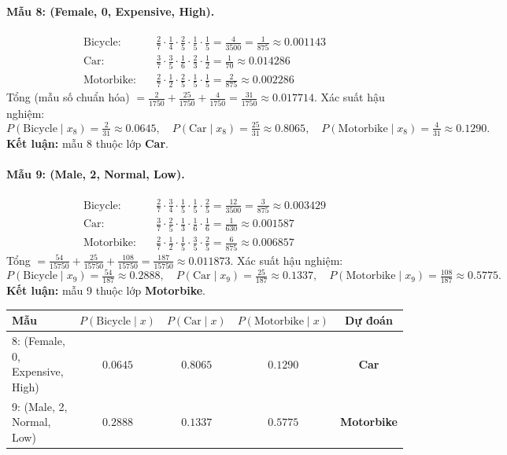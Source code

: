 \documentclass[a4paper,11pt]{article}
\begin{document}
\paragraph{Mẫu 8: (Female, 0, Expensive, High).}
\begin{align*}
\text{Bicycle:}\quad & \tfrac27\cdot\tfrac14\cdot\tfrac25\cdot\tfrac15\cdot\tfrac15=\tfrac{4}{3500}=\tfrac{1}{875}\approx0.001143\\
\text{Car:}\quad & \tfrac37\cdot\tfrac35\cdot\tfrac16\cdot\tfrac23\cdot\tfrac12=\tfrac{1}{70}\approx0.014286\\
\text{Motorbike:}\quad & \tfrac27\cdot\tfrac12\cdot\tfrac25\cdot\tfrac15\cdot\tfrac15=\tfrac{2}{875}\approx0.002286
\end{align*}
Tổng (mẫu số chuẩn hóa) $=\tfrac{2}{1750}+\tfrac{25}{1750}+\tfrac{4}{1750}=\tfrac{31}{1750}\approx0.017714$. Xác suất hậu nghiệm:
\[
P(\text{Bicycle}\mid x_8)=\tfrac{2}{31}\approx0.0645,\quad
P(\text{Car}\mid x_8)=\tfrac{25}{31}\approx0.8065,\quad
P(\text{Motorbike}\mid x_8)=\tfrac{4}{31}\approx0.1290.
\]
\textbf{Kết luận:} mẫu 8 thuộc lớp \textbf{Car}.

\paragraph{Mẫu 9: (Male, 2, Normal, Low).}
\begin{align*}
\text{Bicycle:}\quad & \tfrac27\cdot\tfrac34\cdot\tfrac15\cdot\tfrac15\cdot\tfrac25=\tfrac{12}{3500}=\tfrac{3}{875}\approx0.003429\\
\text{Car:}\quad & \tfrac37\cdot\tfrac25\cdot\tfrac13\cdot\tfrac16\cdot\tfrac16=\tfrac{1}{630}\approx0.001587\\
\text{Motorbike:}\quad & \tfrac27\cdot\tfrac12\cdot\tfrac15\cdot\tfrac35\cdot\tfrac25=\tfrac{6}{875}\approx0.006857
\end{align*}
Tổng $=\tfrac{54}{15750}+\tfrac{25}{15750}+\tfrac{108}{15750}=\tfrac{187}{15750}\approx0.011873$. Xác suất hậu nghiệm:
\[
P(\text{Bicycle}\mid x_9)=\tfrac{54}{187}\approx0.2888,\quad
P(\text{Car}\mid x_9)=\tfrac{25}{187}\approx0.1337,\quad
P(\text{Motorbike}\mid x_9)=\tfrac{108}{187}\approx0.5775.
\]
\textbf{Kết luận:} mẫu 9 thuộc lớp \textbf{Motorbike}.

\begin{center}
\begin{tabular}{@{}lcccc@{}}
\toprule
Mẫu & $P(\text{Bicycle}\mid x)$ & $P(\text{Car}\mid x)$ & $P(\text{Motorbike}\mid x)$ & Dự đoán \\
\midrule
8: (Female, 0, Expensive, High) & $0.0645$ & $\mathbf{0.8065}$ & $0.1290$ & \textbf{Car} \\
9: (Male, 2, Normal, Low) & $0.2888$ & $0.1337$ & $\mathbf{0.5775}$ & \textbf{Motorbike} \\
\bottomrule
\end{tabular}
\end{center}
\end{document}
